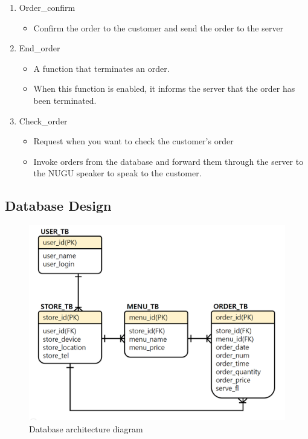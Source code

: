\documentclass[conference,compsoc]{IEEEtran}
\begin{document}
\begin{enumerate}
  \item Order\_confirm
  \begin{itemize}
    \item Confirm the order to the customer and send the order to the server
  \end{itemize}

  \item End\_order
  \begin{itemize}
    \item A function that terminates an order.
    \item When this function is enabled, it informs the server that the order has been terminated.
  \end{itemize}

  \item Check\_order
  \begin{itemize}
    \item Request when you want to check the customer’s order
    \item Invoke orders from the database and forward them through the server to the NUGU speaker to speak to the customer.
  \end{itemize}

\end{enumerate}

\subsection{Database Design}

\begin{figure}[ht!]
  \includegraphics[width=\linewidth]{figures/database.PNG}
  \caption{Database architecture diagram}
  \label{fig:database}
\end{figure}
\end{document}
